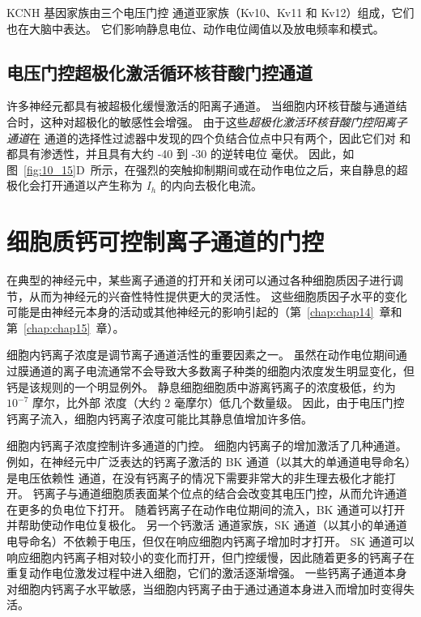 KCNH 基因家族由三个电压门控  通道亚家族（Kv10、Kv11 和 Kv12）组成，它们也在大脑中表达。
它们影响静息电位、动作电位阈值以及放电频率和模式。



\subsection{电压门控超极化激活循环核苷酸门控通道}

许多神经元都具有被超极化缓慢激活的阳离子通道。
当细胞内环核苷酸与通道结合时，这种对超极化的敏感性会增强。
由于这些\textit{超极化激活环核苷酸门控阳离子通道}在  通道的选择性过滤器中发现的四个负结合位点中只有两个，因此它们对  和  都具有渗透性，并且具有大约 -40 到 -30 的逆转电位 毫伏。
因此，如图~\ref{fig:10_15}D~所示，在强烈的突触抑制期间或在动作电位之后，来自静息的超极化会打开通道以产生称为 $I_h$ 的内向去极化电流。



\section{细胞质钙可控制离子通道的门控}

在典型的神经元中，某些离子通道的打开和关闭可以通过各种细胞质因子进行调节，从而为神经元的兴奋性特性提供更大的灵活性。
这些细胞质因子水平的变化可能是由神经元本身的活动或其他神经元的影响引起的（第~\ref{chap:chap14}~章和第~\ref{chap:chap15}~章）。


细胞内钙离子浓度是调节离子通道活性的重要因素之一。
虽然在动作电位期间通过膜通道的离子电流通常不会导致大多数离子种类的细胞内浓度发生明显变化，但钙是该规则的一个明显例外。
静息细胞细胞质中游离钙离子的浓度极低，约为 $10^{-7}$ 摩尔，比外部  浓度（大约 2 毫摩尔）低几个数量级。 
因此，由于电压门控钙离子流入，细胞内钙离子浓度可能比其静息值增加许多倍。


细胞内钙离子浓度控制许多通道的门控。
细胞内钙离子的增加激活了几种通道。
例如，在神经元中广泛表达的钙离子激活的 BK 通道（以其大的单通道电导命名）是电压依赖性  通道，在没有钙离子的情况下需要非常大的非生理去极化才能打开。
钙离子与通道细胞质表面某个位点的结合会改变其电压门控，从而允许通道在更多的负电位下打开。
随着钙离子在动作电位期间的流入，BK 通道可以打开并帮助使动作电位复极化。
另一个钙激活  通道家族，SK 通道（以其小的单通道电导命名）不依赖于电压，但仅在响应细胞内钙离子增加时才打开。
SK 通道可以响应细胞内钙离子相对较小的变化而打开，但门控缓慢，因此随着更多的钙离子在重复动作电位激发过程中进入细胞，它们的激活逐渐增强。
一些钙离子通道本身对细胞内钙离子水平敏感，当细胞内钙离子由于通过通道本身进入而增加时变得失活。


